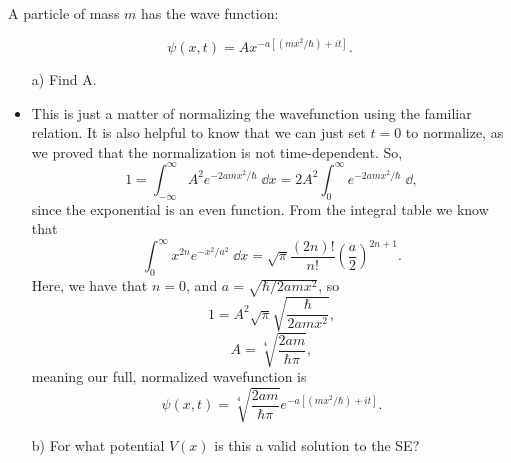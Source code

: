 \begin{example}
    A particle of mass $m$ has the wave function:

    \begin{equation}
        \psi(x,t) = Ax^{-a[(mx^2/\hbar) + it]}.
    \end{equation}

    \begin{itemize}
        \item[a)] Find A.
    \end{itemize}

    \begin{itemize}
        \item This is just a matter of normalizing the wavefunction using the familiar relation. It is also helpful to know that we can just set $t=0$ to normalize, as we proved that the normalization is not time-dependent. So,
            \begin{equation*}
                1 = \int_{-\infty}^{\infty} A^2 e^{-2amx^2/\hbar} \;\dd x = 2A^2 \int_0^{\infty} e^{-2amx^2/\hbar} \;\dd,
            \end{equation*}
            since the exponential is an even function. From the integral table we know that 
            \begin{equation}
                \int_0^{\infty} x^{2n}e^{-x^2/a^2} \;\dd x = \sqrt{\pi} \frac{(2n)!}{n!} \left(\frac{a}{2}\right)^{2n+1}.
            \end{equation}
            Here, we have that $n=0$, and $a = \sqrt{\hbar/2amx^2}$, so
            \begin{equation*}
                1 = A^2 \sqrt{\pi} \sqrt{\frac{\hbar}{2amx^2}},
            \end{equation*}
            \begin{equation}
                \boxed{A = \sqrt[4]{\frac{2am}{\hbar\pi}}},
            \end{equation}
            meaning our full, normalized wavefunction is
            \begin{equation}
                \psi(x,t) = \sqrt[4]{\frac{2am}{\hbar\pi}} e^{-a[(mx^2/\hbar) + it]}.
            \end{equation}
    \end{itemize}

    \begin{itemize}
        \item[b)] For what potential $V(x)$ is this a valid solution to the SE?
    \end{itemize}


\end{example}
